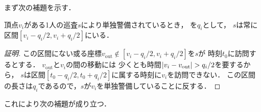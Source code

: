 まず次の補題を示す．

\begin{lemm}
  \label{lemm:RangeOfPatrollerOnLine}
  頂点$v_i$がある1人の巡査$s$により単独警備されているとき，
  {\idletime}を$q_i$として，
  $s$は常に区間$[v_i - q_i/2, v_i + q_i/2]$にいる．
\end{lemm}
\begin{proof}[証明]
  \newcommand{\vout}{v_{\mathrm{out}}}
  この区間にない或る座標$\vout \notin [v_i - q_i/2, v_i + q_i/2]$を$s$が
  時刻$t_0$に訪問するとする．
  $\vout$と$v_i$の間の移動には
  少くとも時間$\abs{v_i - \vout} > q _i / 2$を要するから，
  $s$は区間$[t_0 - q _i / 2, t_0 + q _i / 2]$に属する時刻に$v_i$を訪問できない．
  この区間の長さは$
    q_i
  $であるので，$s$が$v _i$を単独警備していることに反する．
\end{proof}



これにより次の補題が成り立つ．


